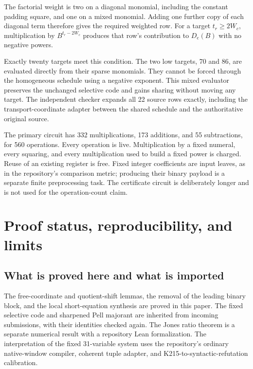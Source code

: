 \documentclass[11pt]{article}
\newcommand{\Dc}{D_{\mathrm c}}
\theoremstyle{remark}\newtheorem{remark}[theorem]{Remark}
\begin{document}
The factorial weight is two on a diagonal monomial, including the
constant padding square, and one on a mixed monomial. Adding one further
copy of each diagonal term therefore gives the required weighted row.
For a target $t_r\geq2W_c$, multiplication by $B^{t_r-2W_c}$ produces
that row's contribution to $\Dc(B)$ with no negative powers.

Exactly twenty targets meet this condition. The two low targets, 70
and 86, are evaluated directly from their sparse monomials. They cannot
be forced through the homogeneous schedule using a negative exponent.
This mixed evaluator preserves the unchanged selective code and gains
sharing without moving any target. The independent checker expands all
22 source rows exactly, including the transport-coordinate adapter between
the shared schedule and the authoritative original source.

The primary circuit has 332 multiplications, 173 additions, and 55
subtractions, for 560 operations. Every operation is live. Multiplication
by a fixed numeral, every squaring, and every multiplication used to build
a fixed power is charged. Reuse of an existing register is free. Fixed
integer coefficients are input leaves, as in the repository's comparison
metric; producing their binary payload is a separate finite preprocessing
task. The certificate circuit is deliberately longer and is not used for
the operation-count claim.

\section{Proof status, reproducibility, and limits}\label{sec:status}

\subsection{What is proved here and what is imported}

The free-coordinate and quotient-shift lemmas, the removal of the leading
binary block, and the local short-equation synthesis are proved in this
paper. The fixed selective code and sharpened Pell majorant are inherited
from incoming submissions, with their identities checked again. The
Jones ratio theorem is a separate numerical result with a repository Lean
formalization. The interpretation of the fixed 31-variable system uses
the repository's ordinary native-window compiler, coherent tuple adapter,
and K215-to-syntactic-refutation calibration.
\end{document}
